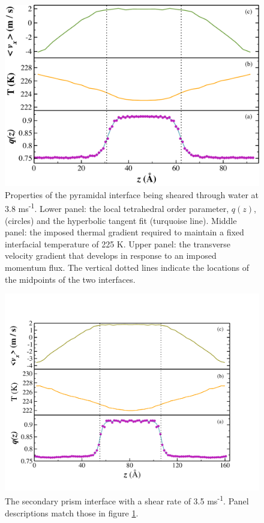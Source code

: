 \documentclass[aps,jcp,preprint,showpacs,superscriptaddress,groupedaddress]{revtex4}  %
\begin{document}
\begin{figure}
\includegraphics[width=\linewidth]{Pyr_comic_strip}
\caption{\label{fig:pyrComic} Properties of the pyramidal interface
  being sheared through water at 3.8 ms\textsuperscript{-1}. Lower
  panel: the local tetrahedral order parameter, $q(z)$, (circles) and
  the hyperbolic tangent fit (turquoise line).  Middle panel: the
  imposed thermal gradient required to maintain a fixed interfacial
  temperature of 225 K. Upper panel: the transverse velocity gradient
  that develops in response to an imposed momentum flux. The vertical
  dotted lines indicate the locations of the midpoints of the two
  interfaces.}
\end{figure}

\newpage
\begin{figure}
\includegraphics[width=\linewidth]{SP_comic_strip}
\caption{\label{fig:spComic} The secondary prism interface with a shear
rate of 3.5 ms\textsuperscript{-1}. Panel descriptions match those in figure \ref{fig:pyrComic}.}
\end{figure}
\end{document}
